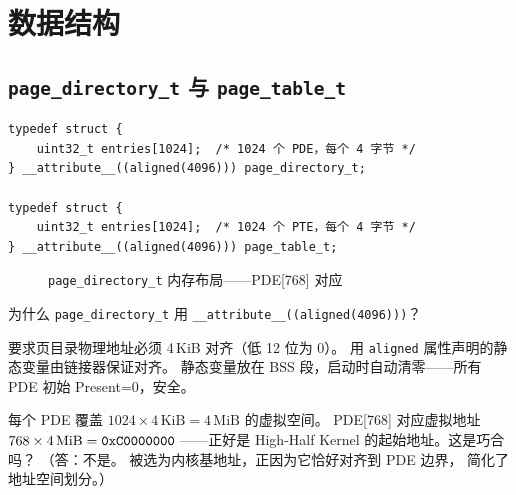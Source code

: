 \section{数据结构}

\subsection{\texttt{page\_directory\_t} 与 \texttt{page\_table\_t}}

\begin{lstlisting}[style=cstyle]
typedef struct {
    uint32_t entries[1024];  /* 1024 个 PDE，每个 4 字节 */
} __attribute__((aligned(4096))) page_directory_t;

typedef struct {
    uint32_t entries[1024];  /* 1024 个 PTE，每个 4 字节 */
} __attribute__((aligned(4096))) page_table_t;
\end{lstlisting}

\begin{figure}[H]
  \centering
  
  \caption{\texttt{page\_directory\_t} 内存布局——PDE[768] 对应 }
  \label{fig:pd-layout}
\end{figure}

\begin{whybox}
为什么 \texttt{page\_directory\_t} 用 \texttt{\_\_attribute\_\_((aligned(4096)))}？

 要求页目录物理地址必须 4\,KiB 对齐（低 12 位为 0）。
用 \texttt{aligned} 属性声明的静态变量由链接器保证对齐。
静态变量放在 BSS 段，启动时自动清零——所有 PDE 初始 Present=0，安全。
\end{whybox}

\begin{thinkbox}
每个 PDE 覆盖 $1024 \times 4\,\text{KiB} = 4\,\text{MiB}$ 的虚拟空间。
PDE[768] 对应虚拟地址 $768 \times 4\,\text{MiB} = \texttt{0xC0000000}$
——正好是 High-Half Kernel 的起始地址。这是巧合吗？
（答：不是。 被选为内核基地址，正因为它恰好对齐到 PDE 边界，
简化了地址空间划分。）
\end{thinkbox}


